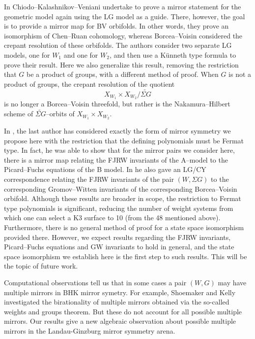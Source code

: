 \documentclass[10pt, letterpaper]{amsart}
\theoremstyle{remark}
\newcommand{\s}[1]{\Sigma #1}
\begin{document}
In \cite{CKV} Chiodo--Kalashnikov--Veniani undertake to prove a mirror statement for the geometric model again using the LG model as a guide. There, however, the goal is to provide a mirror map for BV orbifolds. In other words, they prove an isomorphism of Chen--Ruan cohomology, whereas Borcea--Voisin considered the crepant resolution of these orbifolds. The authors consider two separate LG models, one for $W_1$ and one for $W_2$, and then use a K\"unneth type formula to prove their result. Here we also generalize this result, removing the restriction that $G$ be a product of groups, with a different method of proof. When $G$ is not a product of groups, the crepant resolution of the quotient
\[
X_{W_1}\times X_{W_2}/\widetilde{\s{G}}
\] 
is no longer a Borcea--Voisin threefold, but rather is the Nakamura--Hilbert scheme of $\widetilde{\s{G}}$--orbits of $X_{W_1}\times X_{W_2}$.

In \cite{Schaug2}, the last author has considered exactly the form of mirror symmetry we propose here with the restriction that the defining polynomials must be Fermat type. In fact, he was able to show that for the mirror pairs we consider here, there is a mirror map relating the FJRW invariants of the A--model to the Picard--Fuchs equations of the B model. In \cite{Schaug} he also gave an LG/CY correspondence relating the FJRW invariants of the pair $(W,\s{G})$ to the corresponding Gromov--Witten invariants of the corresponding Borcea--Voisin orbifold. Although these results are broader in scope, the restriction to Fermat type polynomials is  significant, reducing the number of weight systems from which one can select a K3 surface to 10 (from the 48 mentioned above). Furthermore, there is no general method of proof for a state space isomorphism provided there. However, we expect results regarding the FJRW invariants, Picard--Fuchs equations and GW invariants to hold in general, and the state space isomorphism we establish here is the first step to such results. This will be the topic of future work. 

Computational observations tell us that in some cases a pair $(W,G)$ may have multiple mirrors in BHK mirror symetry.  For example, Shoemaker \cite{shoemaker} and Kelly \cite{kelly} investigated the birationality of multiple mirrors obtained via the so-called weights and groups theorem. But these do not account for all possible multiple mirrors.  Our results give a new algebraic observation about possible multiple mirrors in the Landau-Ginzburg mirror symmetry arena.
\end{document}
